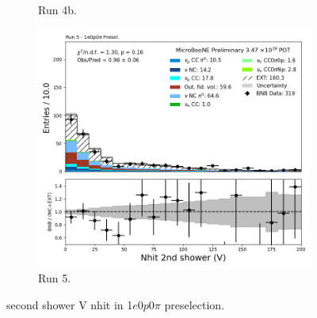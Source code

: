 \begin{figure}[H]
\begin{subfigure}[t]{0.32\linewidth}
        \caption{Run 4b.}
    \end{subfigure}%
    \hspace{0.2cm}%
    \begin{subfigure}[t]{0.32\linewidth}
        \includegraphics[width=\linewidth]{technote/Appendix_Preselection/Figures/1e0p0pi/Run5/secondshower_V_nhit_Run5_1e0p0pi_Presel.png}
        \caption{Run 5.}
    \end{subfigure}
    \caption{second shower V nhit in 1$e$0$p$0$\pi$ preselection.}
\end{figure}


